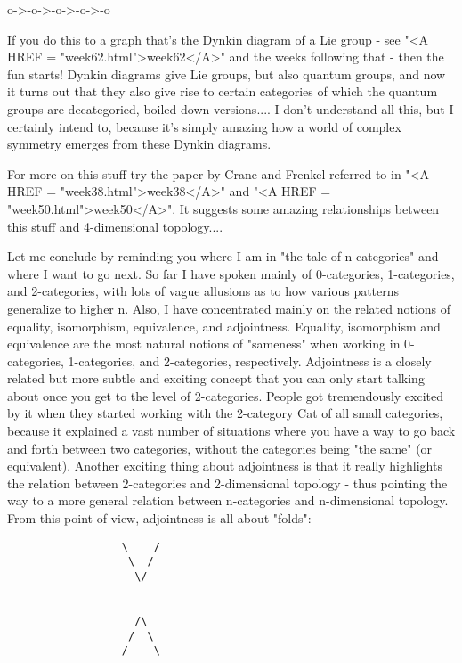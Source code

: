                       o->-o->-o->-o->-o

If you do this to a graph that's the Dynkin diagram of a Lie group -
see "<A HREF = "week62.html">week62</A>" and the weeks following that - then the fun starts!
Dynkin diagrams give Lie groups, but also quantum groups, and now it
turns out that they also give rise to certain categories of which the
quantum groups are decategoried, boiled-down versions.... I don't
understand all this, but I certainly intend to, because it's simply
amazing how a world of complex symmetry emerges from these Dynkin
diagrams.  

For more on this stuff try the paper by Crane and Frenkel referred to in
"<A HREF = "week38.html">week38</A>" and "<A HREF = "week50.html">week50</A>".  It suggests some amazing relationships between
this stuff and 4-dimensional topology....

Let me conclude by reminding you where I am in "the tale of n-categories"
and where I want to go next.  So far I have spoken mainly of 0-categories,
1-categories, and 2-categories, with lots of vague allusions as to how
various patterns generalize to higher n.  Also, I have concentrated mainly
on the related notions of equality, isomorphism, equivalence, and 
adjointness.  Equality, isomorphism and equivalence are the most natural 
notions of "sameness" when working in 0-categories, 1-categories, and 
2-categories, respectively.   Adjointness is a closely related but more 
subtle and exciting concept that you can only start talking about once
you get to the level of 2-categories.  People got tremendously excited
by it when they started working with the 2-category Cat of all small 
categories, because it explained a vast number of situations where you
have a way to go back and forth between two categories, without the
categories being "the same" (or equivalent).  Another exciting thing
about adjointness is that it really highlights the relation between
2-categories and 2-dimensional topology - thus pointing the way
to a more general relation between n-categories and n-dimensional topology.
From this point of view, adjointness is all about "folds":

\begin{verbatim}
                  \    /
                   \  /
                    \/


                    /\
                   /  \
                  /    \ 

\end{verbatim}
    

